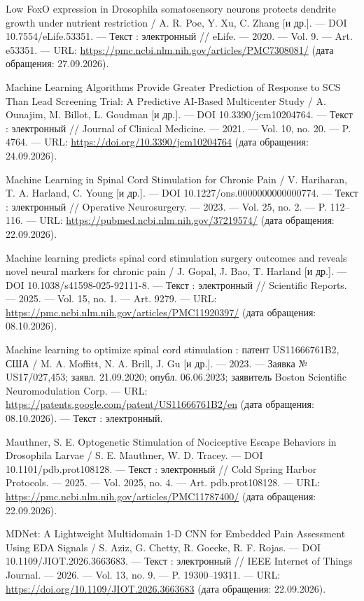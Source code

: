 \begin{list}{}{\setlength{\leftmargin}{10mm}\setlength{\labelwidth}{8mm}\setlength{\labelsep}{2mm}\setlength{\itemsep}{0pt}\setlength{\parsep}{0pt}\setlength{\topsep}{0pt}}
\item[177.] Low FoxO expression in Drosophila somatosensory neurons protects dendrite growth under nutrient restriction / A. R. Poe, Y. Xu, C. Zhang [и др.]. — DOI 10.7554/eLife.53351. — Текст : электронный // eLife. — 2020. — Vol. 9. — Art. e53351. — URL: \url{https://pmc.ncbi.nlm.nih.gov/articles/PMC7308081/} (дата обращения: 27.09.2026).
\item[178.] Machine Learning Algorithms Provide Greater Prediction of Response to SCS Than Lead Screening Trial: A Predictive AI-Based Multicenter Study / A. Ounajim, M. Billot, L. Goudman [и др.]. — DOI 10.3390/jcm10204764. — Текст : электронный // Journal of Clinical Medicine. — 2021. — Vol. 10, no. 20. — P. 4764. — URL: \url{https://doi.org/10.3390/jcm10204764} (дата обращения: 24.09.2026).
\item[179.] Machine Learning in Spinal Cord Stimulation for Chronic Pain / V. Hariharan, T. A. Harland, C. Young [и др.]. — DOI 10.1227/ons.0000000000000774. — Текст : электронный // Operative Neurosurgery. — 2023. — Vol. 25, no. 2. — P. 112–116. — URL: \url{https://pubmed.ncbi.nlm.nih.gov/37219574/} (дата обращения: 22.09.2026).
\item[180.] Machine learning predicts spinal cord stimulation surgery outcomes and reveals novel neural markers for chronic pain / J. Gopal, J. Bao, T. Harland [и др.]. — DOI 10.1038/s41598-025-92111-8. — Текст : электронный // Scientific Reports. — 2025. — Vol. 15, no. 1. — Art. 9279. — URL: \url{https://pmc.ncbi.nlm.nih.gov/articles/PMC11920397/} (дата обращения: 08.10.2026).
\item[181.] Machine learning to optimize spinal cord stimulation : патент US11666761B2, США / M. A. Moffitt, N. A. Brill, J. Gu [и др.]. — 2023. — Заявка № US17/027,453; заявл. 21.09.2020; опубл. 06.06.2023; заявитель Boston Scientific Neuromodulation Corp. — URL: \url{https://patents.google.com/patent/US11666761B2/en} (дата обращения: 08.10.2026). — Текст : электронный.
\item[182.] Mauthner, S. E. Optogenetic Stimulation of Nociceptive Escape Behaviors in Drosophila Larvae / S. E. Mauthner, W. D. Tracey. — DOI 10.1101/pdb.prot108128. — Текст : электронный // Cold Spring Harbor Protocols. — 2025. — Vol. 2025, no. 4. — Art. pdb.prot108128. — URL: \url{https://pmc.ncbi.nlm.nih.gov/articles/PMC11787400/} (дата обращения: 22.09.2026).
\item[183.] MDNet: A Lightweight Multidomain 1-D CNN for Embedded Pain Assessment Using EDA Signals / S. Aziz, G. Chetty, R. Goecke, R. F. Rojas. — DOI 10.1109/JIOT.2026.3663683. — Текст : электронный // IEEE Internet of Things Journal. — 2026. — Vol. 13, no. 9. — P. 19300–19311. — URL: \url{https://doi.org/10.1109/JIOT.2026.3663683} (дата обращения: 22.09.2026).

\end{list}
